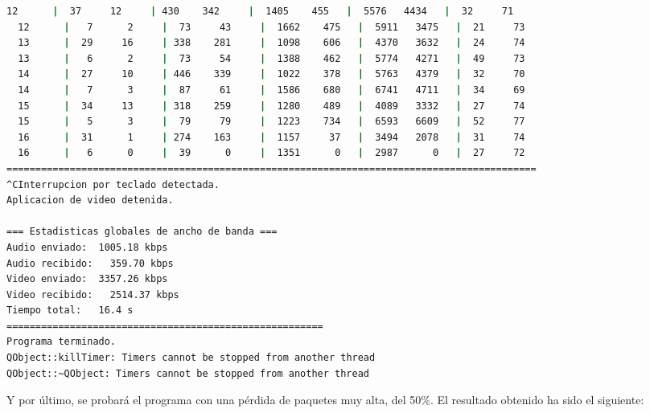 \begin{adjustbox}{max width=\textwidth}
\begin{lstlisting}[language=bash,basicstyle=\ttfamily\scriptsize]
  12      |  37     12     | 430    342     |  1405    455   |  5576   4434   |  32     71
  12      |   7      2     |  73     43     |  1662    475   |  5911   3475   |  21     73
  13      |  29     16     | 338    281     |  1098    606   |  4370   3632   |  24     74
  13      |   6      2     |  73     54     |  1388    462   |  5774   4271   |  49     73
  14      |  27     10     | 446    339     |  1022    378   |  5763   4379   |  32     70
  14      |   7      3     |  87     61     |  1586    680   |  6741   4711   |  34     69
  15      |  34     13     | 318    259     |  1280    489   |  4089   3332   |  27     74
  15      |   5      3     |  79     79     |  1223    734   |  6593   6609   |  52     77
  16      |  31      1     | 274    163     |  1157     37   |  3494   2078   |  31     74
  16      |   6      0     |  39      0     |  1351      0   |  2987      0   |  27     72
============================================================================================
^CInterrupcion por teclado detectada.
Aplicacion de video detenida.

=== Estadisticas globales de ancho de banda ===
Audio enviado:	1005.18 kbps
Audio recibido:   359.70 kbps
Video enviado:	3357.26 kbps
Video recibido:   2514.37 kbps
Tiempo total: 	16.4 s
=======================================================
Programa terminado.
QObject::killTimer: Timers cannot be stopped from another thread
QObject::~QObject: Timers cannot be stopped from another thread
\end{lstlisting}
\end{adjustbox}
\vspace{\baselineskip}

\newpage

Y por último, se probará el programa con una pérdida de paquetes muy alta, del 50\%. El resultado obtenido ha sido el siguiente:
\vspace{\baselineskip}

